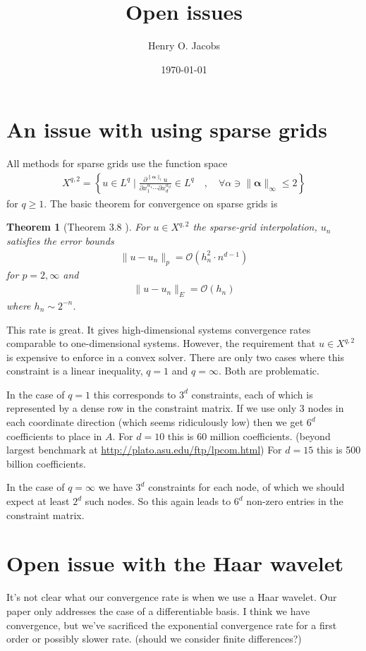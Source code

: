 \documentclass[12pt]{amsart}
\title{Open issues}
\author{Henry O. Jacobs}
\date{\today}
\newtheorem{thm}{Theorem}
\begin{document}
\maketitle

\section{An issue with using sparse grids}

All methods for sparse grids use the function space
\begin{align*}
	X^{q,2} = \left\{ u \in L^q \mid \frac{\partial^{\| \mathbf{\alpha} \|_1} u }{ \partial x_1^{\alpha_1} \cdots \partial x_d^{\alpha_d}} \in L^q \quad ,\quad  \forall \alpha \ni \|\mathbf{\alpha} \|_\infty \leq 2  \right\}
\end{align*}
for $q \geq 1$.
The basic theorem for convergence on sparse grids is

\begin{thm}[Theorem 3.8 \cite{BungartzGriebel2004}]
	For $u \in X^{q,2}$ the sparse-grid interpolation, $u_n$ satisfies the error bounds
	\begin{align*}
		\| u - u_n \|_{p} = \mathcal{O}(h_n^2 \cdot n^{d-1} )
	\end{align*}
	for $p=2,\infty$
	and 
	\begin{align*}
		\| u - u_n \|_E = \mathcal{O}(h_n)
	\end{align*}
	where $h_n \sim 2^{-n}$.
\end{thm}

This rate is great.  It gives high-dimensional systems convergence rates comparable to one-dimensional systems.
However, the requirement that $u \in X^{q,2}$ is expensive to enforce in a convex solver.
There are only two cases where this constraint is a linear inequality, $q= 1$ and $q=\infty$.  Both are problematic.

In the case of $q=1$ this corresponds to $3^d$ constraints, each of which is represented by a dense row in the constraint matrix.
If we use only 3 nodes in each coordinate direction (which seems ridiculously low) then we get $6^d$ coefficients to place in $A$.
For $d=10$ this is 60 million coefficients. (beyond largest benchmark at \url{http://plato.asu.edu/ftp/lpcom.html})
For $d=15$ this is 500 billion coefficients.

In the case of $q=\infty$ we have $3^d$ constraints for each node, of which we should expect at least $2^d$ such nodes.
So this again leads to $6^d$ non-zero entries in the constraint matrix.

\section{Open issue with the Haar wavelet}
It's not clear what our convergence rate is when we use a Haar wavelet.  Our paper only addresses the case of a differentiable basis.
I think we have convergence, but we've sacrificed the exponential convergence rate for a first order or possibly slower rate. (should we consider finite differences?)



\end{document}
